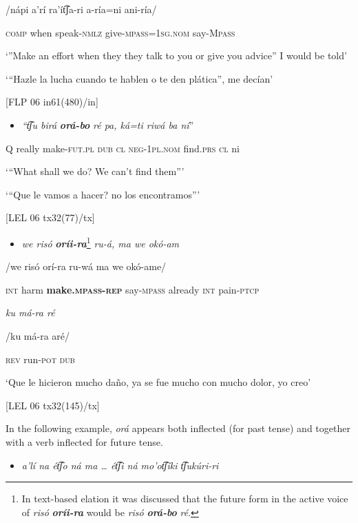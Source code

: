   /nápi  a’rí  ra’ít͡ʃa-ri  a-ría=ni    ani-ría/  

\textsc{comp} when  speak-\textsc{nmlz}   give-\textsc{mpass}=1\textsc{sg.nom}  say-\textsc{Mpass}

  ‘”Make an effort when they they talk to you or give you advice” I would be told’

‘“Hazle la lucha cuando te hablen o te den plática”, me decían’

  [FLP 06 in61(480)/in]

\begin{itemize}
\item \textit{“t͡ʃu   birá} \textbf{\textit{orá-bo}} \textit{ré   pa,   ká=ti     riwá     ba   ní}”
\end{itemize}

  Q  really  make-\textsc{fut.pl}  \textsc{dub  cl}  \textsc{neg-1pl.nom} find.\textsc{prs   cl} ni

  ‘“What shall we do? We can’t find them”’

‘“Que le vamos a hacer? no los encontramos”’

  [LEL 06 tx32(77)/tx]

\begin{itemize}
\item \textit{we   risó} \textbf{\textit{oríi-ra}}\footnote{In text-based elation it was discussed that the future form in the active voice of \textit{risó} \textbf{\textit{oríi-ra}} would be \textit{risó} \textbf{\textit{orá-bo}} \textit{ré}.} \textit{ru-á,     ma   we   okó-am} 
\end{itemize}

/we  risó  orí-ra      ru-wá    ma  we  okó-ame/  

  \textsc{int}       harm   \textbf{make.\textsc{mpass-rep}}   say-\textsc{mpass}  already  \textsc{int} pain-\textsc{ptcp}

  \textit{ku   má-ra     ré}

 /ku  má-ra    aré/ 

  \textsc{rev} run-\textsc{pot  dub}

  ‘Que le hicieron mucho daño, ya se fue mucho con mucho dolor, yo creo’

  [LEL 06 tx32(145)/tx]

  In the following example, \textit{orá} appears both inflected (for past tense) and together with a verb inflected for future tense. 

\begin{itemize}
\item \textit{a’lí   na      ét͡ʃo   ná       ma …     ét͡ʃi   ná     mo’ot͡ʃíki    t͡ʃukúri-ri}  
\end{itemize}

